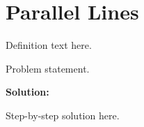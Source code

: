 \section{Parallel Lines}


\begin{definition}[Term]
Definition text here.
\end{definition}

\begin{example}
Problem statement.

\textbf{Solution:}

Step-by-step solution here.
\end{example}
